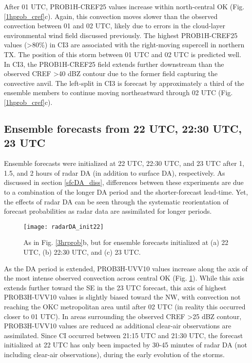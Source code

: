 After 01 UTC, PROB1H-CREF25 values increase within north-central OK (Fig. \ref{1hprob_cref}c). Again, this convection moves slower than the observed convection between 01 and 02 UTC, likely due to errors in the cloud-layer environmental wind field discussed previously. The highest PROB1H-CREF25 values (\textgreater 80\%) in CI3 are associated with the right-moving supercell in northern TX. The position of this storm between 01 UTC and 02 UTC is predicted well. In CI3, the PROB1H-CREF25 field extends further downstream than the observed CREF \textgreater 40 dBZ contour due to the former field capturing the convective anvil. The left-split in CI3 is forecast by approximately a third of the ensemble members to continue moving northeastward through 02 UTC (Fig. \ref{1hprob_cref}c).

\subsection{Ensemble forecasts from 22 UTC, 22:30 UTC, 23 UTC}
\label{inittime_section}
Ensemble forecasts were initialized at 22 UTC, 22:30 UTC, and 23 UTC after 1, 1.5, and 2 hours of radar DA (in addition to surface DA), respectively. As discussed in section \ref{sfcDA_diss}, differences between these experiments are due to a combination of the longer DA period and the shorter-forecast lead-time. Yet, the effects of radar DA can be seen through the systematic reorientation of forecast probabilities as radar data are assimilated for longer periods.

\begin{figure}
\centering
\texttt{[image: radarDA\_init22]}
\caption{As in Fig. \ref{3hrprob}b, but for ensemble forecasts initialized at (a) 22 UTC, (b) 22:30 UTC, and (c) 23 UTC.}
\label{init22}
\end{figure}

As the DA period is extended, PROB3H-UVV10 values increase along the axis of the most intense observed convection across central OK (Fig. \ref{init22}). While this axis extends further toward the SE in the 23 UTC forecast, this axis of highest PROB3H-UVV10 values is slightly biased toward the NW, with convection not reaching the OKC metropolitan area until after 02 UTC (in reality this occurred closer to 01 UTC). In areas surrounding the observed CREF \textgreater 25 dBZ contour, PROB3H-UVV10 values are reduced as additional clear-air observations are assimilated. Since CI occurred between 21:15 UTC and 21:30 UTC, the forecast initialized at 22 UTC has only been impacted by 30-45 minutes of radar DA (not including clear-air observations), during the early evolution of the storms.

